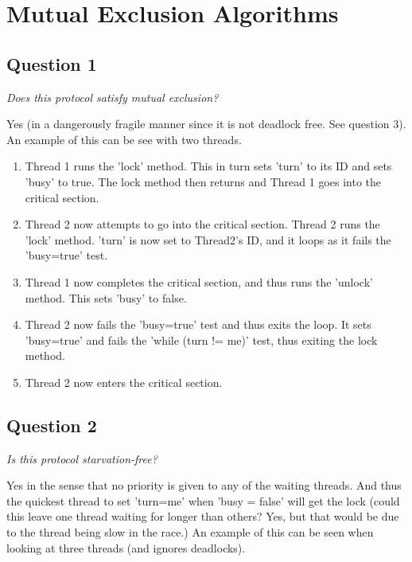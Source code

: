 \section{Mutual Exclusion Algorithms}

\subsection{Question 1}

\begin{center}
    \textit{Does this protocol satisfy mutual exclusion?}
\end{center}

Yes (in a dangerously fragile manner since it is not deadlock free. See question 
3). An example of this can be see with two threads.

\begin{enumerate}
    \item Thread 1 runs the 'lock' method. This in turn sets 'turn' to its ID 
    and sets 'busy' to true. The lock method then returns and Thread 1 goes into 
    the critical section.
    \item Thread 2 now attempts to go into the critical section. Thread 2 runs 
    the 'lock' method. 'turn' is now set to Thread2's ID, and it loops as it 
    fails the 'busy=true' test.
    \item Thread 1 now completes the critical section, and thus runs the 'unlock'
    method. This sets 'busy' to false.
    \item Thread 2 now fails the 'busy=true' test and thus exits the loop. 
    It sets 'busy=true' and fails the 'while (turn != me)' test, thus exiting 
    the lock method.
    \item Thread 2 now enters the critical section.
\end{enumerate}

\subsection{Question 2}

\begin{center}
    \textit{Is this protocol starvation-free?}
\end{center}

Yes in the sense that no priority is given to any of the waiting threads. 
And thus the quickest thread to set 'turn=me' when 'busy = false' will get the 
lock (could this leave one thread waiting for longer than others? Yes, but that 
would be due to the thread being slow in the race.) An example of this can be 
seen when looking at three threads (and ignores deadlocks).

